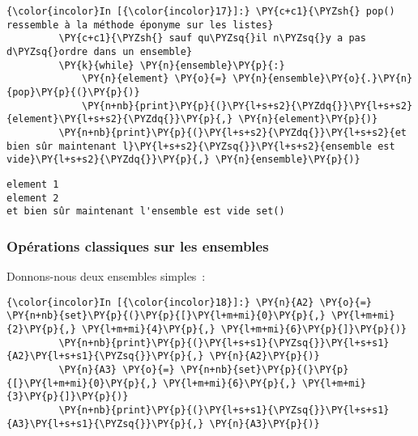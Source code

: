     \begin{Verbatim}[commandchars=\\\{\},frame=single,framerule=0.3mm,rulecolor=\color{cellframecolor}]
{\color{incolor}In [{\color{incolor}17}]:} \PY{c+c1}{\PYZsh{} pop() ressemble à la méthode éponyme sur les listes}
         \PY{c+c1}{\PYZsh{} sauf qu\PYZsq{}il n\PYZsq{}y a pas d\PYZsq{}ordre dans un ensemble}
         \PY{k}{while} \PY{n}{ensemble}\PY{p}{:}
             \PY{n}{element} \PY{o}{=} \PY{n}{ensemble}\PY{o}{.}\PY{n}{pop}\PY{p}{(}\PY{p}{)}
             \PY{n+nb}{print}\PY{p}{(}\PY{l+s+s2}{\PYZdq{}}\PY{l+s+s2}{element}\PY{l+s+s2}{\PYZdq{}}\PY{p}{,} \PY{n}{element}\PY{p}{)}
         \PY{n+nb}{print}\PY{p}{(}\PY{l+s+s2}{\PYZdq{}}\PY{l+s+s2}{et bien sûr maintenant l}\PY{l+s+s2}{\PYZsq{}}\PY{l+s+s2}{ensemble est vide}\PY{l+s+s2}{\PYZdq{}}\PY{p}{,} \PY{n}{ensemble}\PY{p}{)}
\end{Verbatim}


    \begin{Verbatim}[commandchars=\\\{\},frame=single,framerule=0.3mm,rulecolor=\color{cellframecolor}]
element 1
element 2
et bien sûr maintenant l'ensemble est vide set()
\end{Verbatim}

    \hypertarget{opuxe9rations-classiques-sur-les-ensembles}{%
\subsubsection{Opérations classiques sur les
ensembles}\label{opuxe9rations-classiques-sur-les-ensembles}}

    Donnons-nous deux ensembles simples~:

    \begin{Verbatim}[commandchars=\\\{\},frame=single,framerule=0.3mm,rulecolor=\color{cellframecolor}]
{\color{incolor}In [{\color{incolor}18}]:} \PY{n}{A2} \PY{o}{=} \PY{n+nb}{set}\PY{p}{(}\PY{p}{[}\PY{l+m+mi}{0}\PY{p}{,} \PY{l+m+mi}{2}\PY{p}{,} \PY{l+m+mi}{4}\PY{p}{,} \PY{l+m+mi}{6}\PY{p}{]}\PY{p}{)}
         \PY{n+nb}{print}\PY{p}{(}\PY{l+s+s1}{\PYZsq{}}\PY{l+s+s1}{A2}\PY{l+s+s1}{\PYZsq{}}\PY{p}{,} \PY{n}{A2}\PY{p}{)}
         \PY{n}{A3} \PY{o}{=} \PY{n+nb}{set}\PY{p}{(}\PY{p}{[}\PY{l+m+mi}{0}\PY{p}{,} \PY{l+m+mi}{6}\PY{p}{,} \PY{l+m+mi}{3}\PY{p}{]}\PY{p}{)}
         \PY{n+nb}{print}\PY{p}{(}\PY{l+s+s1}{\PYZsq{}}\PY{l+s+s1}{A3}\PY{l+s+s1}{\PYZsq{}}\PY{p}{,} \PY{n}{A3}\PY{p}{)}
\end{Verbatim}


